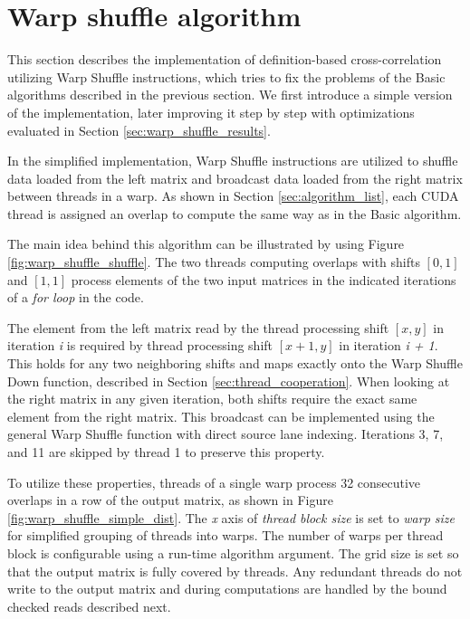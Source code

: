 \section{Warp shuffle algorithm}
\label{sec:warp_shuffle_alg}

This section describes the implementation of definition-based cross-correlation utilizing Warp Shuffle instructions, which tries to fix the problems of the Basic algorithms described in the previous section. We first introduce a simple version of the implementation, later improving it step by step with optimizations evaluated in Section \ref{sec:warp_shuffle_results}.

In the simplified implementation, Warp Shuffle instructions are utilized to shuffle data loaded from the left matrix and broadcast data loaded from the right matrix between threads in a warp. As shown in Section \ref{sec:algorithm_list}, each CUDA thread is assigned an overlap to compute the same way as in the Basic algorithm.

The main idea behind this algorithm can be illustrated by using Figure \ref{fig:warp_shuffle_shuffle}. The two threads computing overlaps with shifts $[0,1]$ and $[1,1]$ process elements of the two input matrices in the indicated iterations of a \textit{for loop} in the code.


The element from the left matrix read by the thread processing shift $[x, y]$ in iteration \textit{i} is required by thread processing shift $[x + 1,y]$ in iteration \textit{i + 1}. This holds for any two neighboring shifts and maps exactly onto the Warp Shuffle Down function, described in Section \ref{sec:thread_cooperation}. When looking at the right matrix in any given iteration, both shifts require the exact same element from the right matrix. This broadcast can be implemented using the general Warp Shuffle function with direct source lane indexing. Iterations 3, 7, and 11 are skipped by thread 1 to preserve this property.


To utilize these properties, threads of a single warp process 32 consecutive overlaps in a row of the output matrix, as shown in Figure \ref{fig:warp_shuffle_simple_dist}. The \textit{x} axis of \textit{thread block size} is set to \textit{warp size} for simplified grouping of threads into warps. The number of warps per thread block is configurable using a run-time algorithm argument. The grid size is set so that the output matrix is fully covered by threads. Any redundant threads do not write to the output matrix and during computations are handled by the bound checked reads described next.

